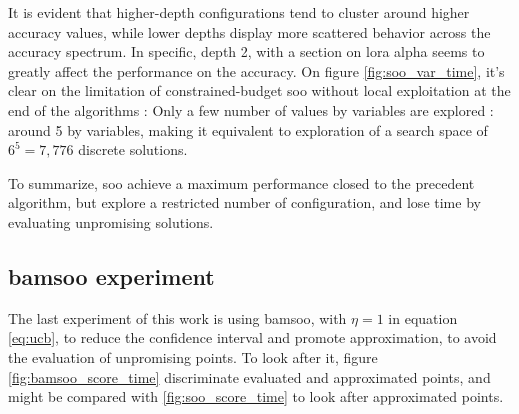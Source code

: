 It is evident that higher-depth configurations tend to cluster around higher accuracy values, while lower depths display more scattered behavior across the accuracy spectrum. In specific, depth 2, with a section on lora alpha seems to greatly affect the performance on the accuracy. On figure \ref{fig:soo_var_time}, it's clear on the limitation of constrained-budget \acrshort{soo} without local exploitation at the end of the algorithms : Only a few number of values by variables are explored : around 5 by variables, making it equivalent to exploration of a search space of $6^5=7,776$ discrete solutions.

To summarize, \acrshort{soo} achieve a maximum performance closed to the precedent algorithm, but explore a restricted number of configuration, and lose time by evaluating unpromising solutions.
\subsection{\acrshort{bamsoo} experiment}
\label{sec:bamsoo_exp}

The last experiment of this work is using \acrshort{bamsoo}, with $\eta = 1$ in equation \ref{eq:ucb}, to reduce the confidence interval and promote approximation, to avoid the evaluation of unpromising points. To look after it, figure \ref{fig:bamsoo_score_time} discriminate evaluated and approximated points, and might be compared with \ref{fig:soo_score_time} to look after approximated points.



